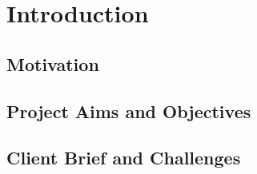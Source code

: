 \chapter{Introduction}
\section{Motivation}
\section{Project Aims and Objectives}
\section{Client Brief and Challenges}
